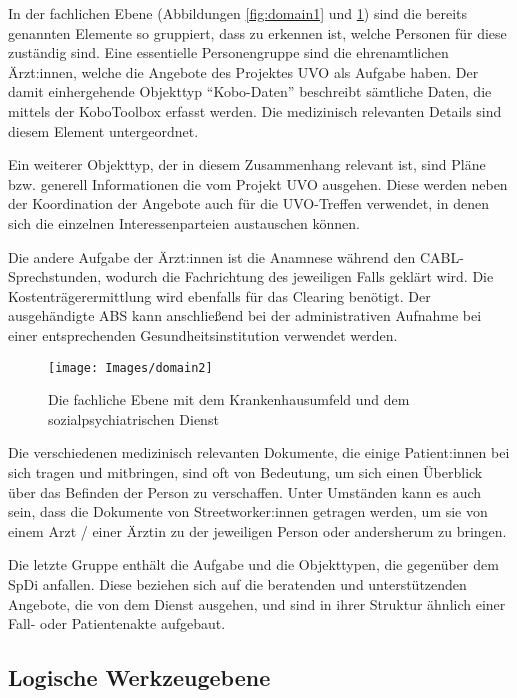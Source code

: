 In der fachlichen Ebene (Abbildungen \ref{fig:domain1} und \ref{fig:domain2}) sind die bereits genannten Elemente so gruppiert, dass zu erkennen ist, welche Personen für diese zuständig sind. Eine essentielle Personengruppe sind die ehrenamtlichen Ärzt:innen, welche die Angebote des Projektes \ac{UVO} als Aufgabe haben. Der damit einhergehende Objekttyp \enquote{Kobo-Daten} beschreibt sämtliche Daten, die mittels der KoboToolbox erfasst werden. Die medizinisch relevanten Details sind diesem Element untergeordnet.

Ein weiterer Objekttyp, der in diesem Zusammenhang relevant ist, sind Pläne bzw. generell Informationen die vom Projekt \ac{UVO} ausgehen. Diese werden neben der Koordination der Angebote auch für die UVO-Treffen verwendet, in denen sich die einzelnen Interessenparteien austauschen können.

Die andere Aufgabe der Ärzt:innen ist die Anamnese während den CABL-Sprechstunden, wodurch die Fachrichtung des jeweiligen Falls geklärt wird. Die Kostenträgerermittlung wird ebenfalls für das Clearing benötigt. Der ausgehändigte \ac{ABS} kann anschließend bei der administrativen Aufnahme bei einer entsprechenden Gesundheitsinstitution verwendet werden.

\begin{figure}[h]
	\centering
	\texttt{[image: Images/domain2]}
	\caption[Fachliche Ebene - UKL und SpDi]{Die fachliche Ebene mit dem Krankenhausumfeld und dem sozialpsychiatrischen Dienst}
	\label{fig:domain2}
\end{figure}

Die verschiedenen medizinisch relevanten Dokumente, die einige Patient:innen bei sich tragen und mitbringen, sind oft von Bedeutung, um sich einen Überblick über das Befinden der Person zu verschaffen. Unter Umständen kann es auch sein, dass die Dokumente von Streetworker:innen getragen werden, um sie von einem Arzt / einer Ärztin zu der jeweiligen Person oder andersherum zu bringen.

Die letzte Gruppe enthält die Aufgabe und die Objekttypen, die gegenüber dem \ac{SpDi} anfallen. Diese beziehen sich auf die beratenden und unterstützenden Angebote, die von dem Dienst ausgehen, und sind in ihrer Struktur ähnlich einer Fall- oder Patientenakte aufgebaut.

\subsection{Logische Werkzeugebene}

